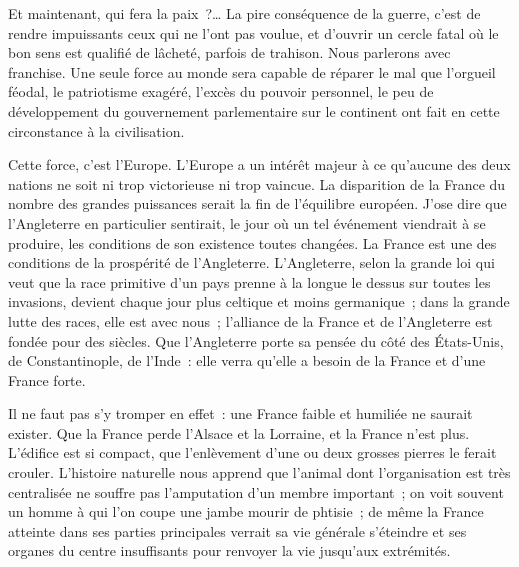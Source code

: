 \documentclass[french,twoside]{book} %
\begin{document}
Et maintenant, qui fera la paix ?… La pire conséquence de la guerre, c’est de rendre impuissants ceux qui ne l’ont pas voulue, et d’ouvrir un cercle fatal où le bon sens est qualifié de lâcheté, parfois de trahison. Nous parlerons avec franchise. Une seule force au monde sera capable de réparer le mal que l’orgueil féodal, le patriotisme exagéré, l’excès du pouvoir personnel, le peu de développement du gouvernement parlementaire sur le continent ont fait en cette circonstance à la civilisation.\par
Cette force, c’est l’Europe. L’Europe a un intérêt majeur à ce qu’aucune des deux nations ne soit ni trop victorieuse ni trop vaincue. La disparition de la France du nombre des grandes puissances serait la fin de l’équilibre européen. J’ose dire que l’Angleterre en particulier sentirait, le jour où un tel événement viendrait à se produire, les conditions de son existence toutes changées. La France est une des conditions de la prospérité de l’Angleterre. L’Angleterre, selon la grande loi qui veut que la race primitive d’un pays prenne à la longue le dessus sur toutes les invasions, devient chaque jour plus celtique et moins germanique ; dans la grande lutte des races, elle est avec nous ; l’alliance de la France et de l’Angleterre est fondée pour des siècles. Que l’Angleterre porte sa pensée du côté des États-Unis, de Constantinople, de l’Inde : elle verra qu’elle a besoin de la France et d’une France forte.\par
Il ne faut pas s’y tromper en effet : une France faible et humiliée ne saurait exister. Que la France perde l’Alsace et la Lorraine, et la France n’est plus. L’édifice est si compact, que l’enlèvement d’une ou deux grosses pierres le ferait crouler. L’histoire naturelle nous apprend que l’animal dont l’organisation est très centralisée ne souffre pas l’amputation d’un membre important ; on voit souvent un homme à qui l’on coupe une jambe mourir de phtisie ; de même la France atteinte dans ses parties principales verrait sa vie générale s’éteindre et ses organes du centre insuffisants pour renvoyer la vie jusqu’aux extrémités.\par
\end{document}
